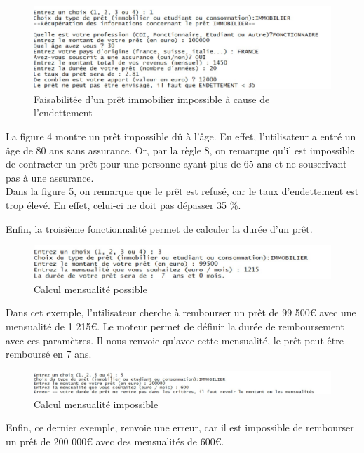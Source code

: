 \documentclass[
]{article}
\begin{document}
\begin{figure}[H]
\centering
\includegraphics{img/fpret_impossible_endettement.jpg}
\caption{Faisabilitée d'un prêt immobilier impossible à cause de
l'endettement}
\end{figure}

La figure 4 montre un prêt impossible dû à l'âge. En effet,
l'utilisateur a entré un âge de 80 ans sans assurance. Or, par la règle
8, on remarque qu'il est impossible de contracter un prêt pour une
personne ayant plus de 65 ans et ne souscrivant pas à une assurance.\\
Dans la figure 5, on remarque que le prêt est refusé, car le taux
d'endettement est trop élevé. En effet, celui-ci ne doit pas dépasser 35
\%.

Enfin, la troisième fonctionnalité permet de calculer la durée d'un
prêt.

\begin{figure}[H]
  \centering
  \includegraphics{img/calcul_duree_possible.jpg}
  \caption{Calcul mensualité possible}
\end{figure}

Dans cet exemple, l'utilisateur cherche à rembourser un prêt de 99 500€
avec une mensualité de 1 215€. Le moteur permet de définir la durée de
remboursement avec ces paramètres. Il nous renvoie qu'avec cette
mensualité, le prêt peut être remboursé en 7 ans.

\begin{figure}[H]
\centering
\includegraphics{img/calcul_duree_impossible.jpg}
\caption{Calcul mensualité impossible}
\end{figure}

Enfin, ce dernier exemple, renvoie une erreur, car il est impossible de
rembourser un prêt de 200 000€ avec des mensualités de 600€.
\end{document}
